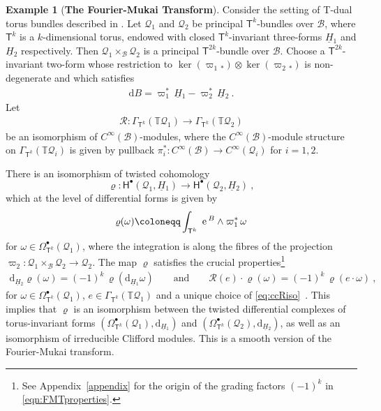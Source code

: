 \documentclass[a4paper, reqno, 11pt]{amsart}
\numberwithin{equation}{section}
\theoremstyle{definition}
\newtheorem{example}[equation]{Example}
\newcommand{\red}[1]{\underline{#1}}
\newcommand{\de}{\mathrm{d}}
\newcommand{\e}{\mathrm{e}}
\newcommand{\IT}{\mathbb{T}}
\def\e{{\,\rm e}\,}
\newcommand{\cB}{{\mathcal B}}
\newcommand{\cQ}{{\mathcal Q}}
\newcommand{\ccR}{{\mathscr R}}
\newcommand{\sfT}{{\mathsf{T}}}
\newcommand{\sfH}{{\mathsf{H}}}
\newcommand{\sfGamma}{{\mathsf{\Gamma}}}
\newcommand{\sfOmega}{{\mathsf{\Omega}}}
\theoremstyle{remark}
\begin{document}
\begin{example}[\textbf{The Fourier-Mukai Transform}]\label{ex:FourierMukai}
Consider the setting of T-dual torus bundles described in \cite{ bouwknegt2004tduality,cavalcanti2011generalized}. Let $\cQ_1$ and $\cQ_2$ be principal $\sfT^k$-bundles over $\cB$, where $\sfT^k$ is a $k$-dimensional torus, endowed with closed $\sfT^k$-invariant three-forms $\red H{}_1$ and $\red H{}_2$ respectively. Then $\cQ_1\times_\cB\cQ_2$ is a principal $\sfT^{2k}$-bundle over $\cB$. Choose a $\sfT^{2k}$-invariant two-form \smash{$B\in\sfOmega^2_{\sfT^{2k}}(\cQ_1\times_\cB\cQ_2)$} whose restriction to $\ker(\varpi_1{}_*)\otimes\ker(\varpi_2{}_*)$ is non-degenerate and which satisfies 
\begin{align}
   \de B = \varpi_1^*\,\red H{}_1-\varpi_2^*\, \red H{}_2 \ .
\end{align}
Let
\begin{align}\label{eq:ccRiso}
    \ccR:\sfGamma_{\sfT^k}(\IT\cQ_1)\longrightarrow\sfGamma_{\sfT^k}(\IT\cQ_2)
\end{align}
be an isomorphism of $C^\infty(\cB)$-modules, where the $C^\infty(\cB)$-module structure on $\sfGamma_{\sfT^k}(\IT\cQ_i)$ is given by pullback $\pi_i^*:C^\infty(\cB)\to C^\infty(\cQ_i)$ for $i=1,2$.

There is an isomorphism of twisted cohomology $$\varrho \colon \sfH^\bullet(\cQ_1, \red H{}_1) \longrightarrow \sfH^\bullet(\cQ_2, \red H{}_2) \ , $$ which at the level of differential forms is given by 
\begin{align}\label{eqn:FMT}
    \varrho(\omega) \coloneqq \int_{\sfT^k}\, \e^{B}\wedge \varpi_1^*\,\omega  
\end{align}
for $\omega\in\sfOmega_{\sfT^k}^\bullet(\cQ_1)$, where the integration is along the fibres of the projection $\varpi_2:\cQ_1 \times_{\cB} \cQ_2 \to \cQ_2$. The map $\varrho$ satisfies the crucial properties\footnote{See Appendix~\ref{appendix} for the origin of the grading factors $(-1)^k$ in \eqref{eqn:FMTproperties}.} 
\begin{align}\label{eqn:FMTproperties}
    \de_{\red H{}_2} \varrho( \omega) = (-1)^k\, \varrho(\de_{\red H{}_1} \omega) \qquad \text{and} \qquad \mathscr{R}(e) \cdot\varrho( \omega) = (-1)^k\,\varrho( e\cdot \omega) \ ,
\end{align}
for $\omega\in\sfOmega_{\sfT^k}^\bullet(\cQ_1)$, $e\in\sfGamma_{\sfT^k}(\IT\cQ_1)$ and a unique choice of \eqref{eq:ccRiso}~\cite{cavalcanti2011generalized}.
This implies that $\varrho$ is an isomorphism between the twisted differential complexes of torus-invariant forms $(\sfOmega_{\sfT^k}^\bullet(\cQ_1), \de_{\red H{}_1})$ and $(\sfOmega_{\sfT^k}^\bullet(\cQ_2), \de_{\red H{}_2})$, as well as an isomorphism of irreducible Clifford modules. This is a smooth version of the Fourier-Mukai transform.


\end{example}
\end{document}

